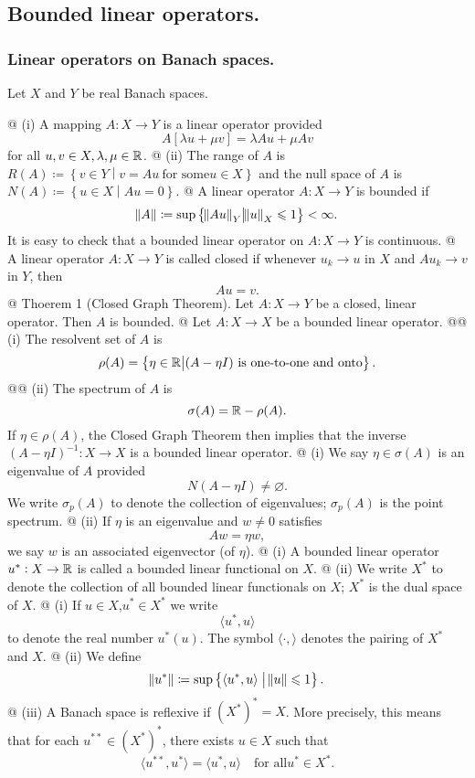 \subsection{Bounded linear operators.}
\subsubsection{Linear operators on Banach spaces.}
Let $X$ and $Y$ be real Banach spaces.

\beeli
@ (i) A mapping $A:X\to Y$ is a linear operator provided $$A[\lambda u+\mu v] =
\lambda Au + \mu Av$$ for all $u, v\in X,\lambda,\mu\in\mathbb{R}$.
@ (ii) The range of $A$ is $R(A)\coloneqq\left\{v\in Y\middle|v=Au~\text{for
some}u\in X\right\}$ and the null space of $A$ is $N(A)\coloneqq\left\{u\in
X\middle| Au=0\right\}$.
@ A linear operator $A:X\to Y$ is bounded if
$$\norm{A}\coloneqq\sup\left\{\norm{Au}_Y\middle|\norm{u}_X\leqslant
1\right\}<\infty.$$ It is easy to check that a bounded linear operator on
$A:X\to Y$ is continuous.
@ A linear operator $A:X\to Y$ is called closed if whenever $u_k\to u$ in $X$
and $Au_k\to v$ in $Y$, then $$Au=v.$$
@ Thoerem 1 (Closed Graph Theorem). Let $A:X\to Y$ be a closed, linear operator.
Then $A$ is bounded.
@ Let $A:X\to X$ be a bounded linear operator.
@@ (i) The resolvent set of $A$ is $$\rho(A)=\left\{\eta\in\mathbb{R}\middle|(A-\eta
I)~\text{is one-to-one and onto}\right\}.$$
@@ (ii) The spectrum of $A$ is $$\sigma(A)=\mathbb{R}-\rho(A).$$
If $\eta\in\rho(A)$, the Closed Graph Theorem then implies that the inverse
$(A-\eta I)^{-1}:X\to X$ is a bounded linear operator.
@ (i) We say $\eta\in\sigma(A)$ is an eigenvalue of $A$ provided $$N(A-\eta
I)\neq\varnothing.$$ We write $\sigma_p(A)$ to denote the collection of
eigenvalues; $\sigma_p(A)$ is the point spectrum.
@ (ii) If $\eta$ is an eigenvalue and $w\neq 0$ satisfies $$Aw=\eta w,$$ we say
$w$ is an associated eigenvector (of $\eta$).
@ (i) A bounded linear operator $u^\ast:X\to\mathbb{R}$ is called a bounded linear
functional on $X$.
@ (ii) We write $X^\ast$ to denote the collection of all bounded linear
functionals on $X$; $X^\ast$ is the dual space of $X$.
@ (i) If $u\in X$,$u^\ast\in X^\ast$ we write $$\langle u^\ast,u\rangle$$ to
denote the real number $u^\ast(u)$. The symbol $\langle\cdot{,}\rangle$ denotes
the pairing of $X^\ast$ and $X$.
@ (ii) We define
$$\norm{u^\ast}\coloneqq\sup\left\{\langle u^\ast,u\rangle\;\middle|\;\norm{u}\leqslant
1\right\}.$$
@ (iii) A Banach space is reflexive if $(X^\ast)^\ast=X$. More precisely, this
means that for each $u^{\ast\ast}\in(X^\ast)^\ast$, there exists $u\in X$ such
that $$\langle u^{\ast\ast},u^\ast\rangle=\langle u^\ast,u\rangle\quad\text{for
all}u^\ast\in X^\ast.$$
\eeel
